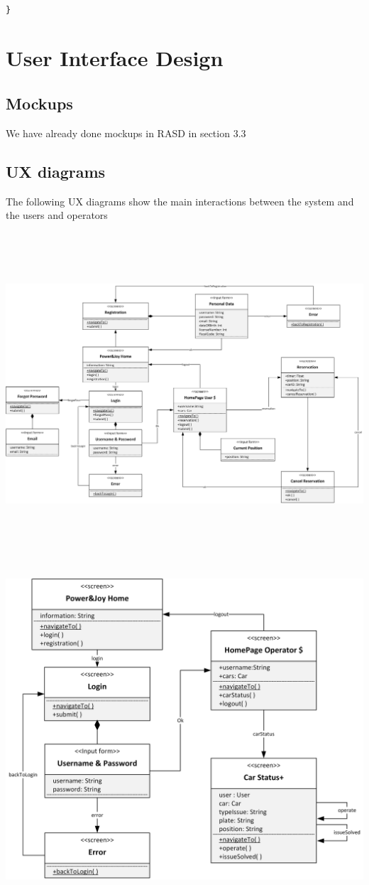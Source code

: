 \documentclass{article}
\begin{document}
\begin{flushleft}
\begin{lstlisting}
	
}
\end{lstlisting}

\section{User Interface Design} %
\subsection{Mockups}%
We have already done mockups in RASD in section 3.3\break
\newpage
\subsection{UX diagrams} %
The following UX diagrams show the main interactions between the system and the users and operators\break


\includegraphics[width=15cm, height=12cm]{UxRegistrationReservation} \break
 



\includegraphics[width=15cm, height=12cm]{operatorux} 
\newpage

\end{flushleft}
\end{document}
